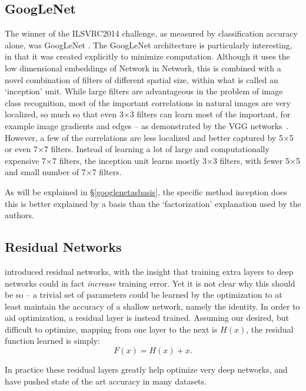 \documentclass[thesis]{subfiles}
\begin{document}
\subsection{GoogLeNet}
The winner of the ILSVRC2014 challenge, as measured by classification accuracy alone, was GoogLeNet \citep{Szegedy2014going}. The GoogLeNet architecture is particularly interesting, in that it was created explicitly to minimize computation. Although it uses the low dimensional embeddings of Network in Network, this is combined with a novel combination of filters of different spatial size, within what is called an `inception' unit. While large filters are advantageous in the problem of image class recognition, most of the important correlations in natural images are very localized, so much so that even 3$\times$3 filters can learn most of the important, for example image gradients and edges -- as demonstrated by the VGG networks~\citep{Simonyan2014verydeep}. However, a few of the correlations are less localized and better captured by 5$\times$5 or even 7$\times$7 filters. Instead of learning a lot of large and computationally expensive 7$\times$7 filters, the inception unit learns mostly 3$\times$3 filters, with fewer 5$\times$5 and small number of 7$\times$7 filters. 

As will be explained in \S{\ref{googlenetasbasis}}, the specific method inception does this is better explained by a basis than the `factorization' explanation used by the authors.

\subsection{Residual Networks}
\citet{He2015} introduced residual networks, with the insight that training extra layers to deep networks could in fact \emph{increase} training error. Yet it is not clear why this should be so -- a trivial set of parameters could be learned by the optimization to at least maintain the accuracy of a shallow network, namely the identity. In order to aid optimization, a residual layer is instead trained. Assuming our desired, but difficult to optimize, mapping from one layer to the next is $H(x)$, the residual function learned is simply:
\begin{equation}
	F(x) = H(x) + x.
\end{equation}

In practice these residual layers greatly help optimize very deep networks, and have pushed state of the art accuracy in many datasets.
\end{document}
